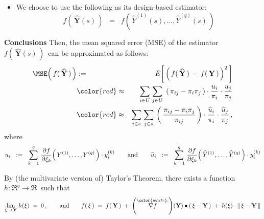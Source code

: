 \begin{proposition}
\begin{itemize}
    The target population parameter is:
    \begin{equation*}
    f\!\left(\,\mathbf{Y}\,\right)
    \;\; = \;\;
        f\!\left(\,Y^{(1)},\ldots,Y^{(q)}\,\right)
    \end{equation*}
\item
    We choose to use the following as its design-based estimator:
    \begin{equation*}
    f\!\left(\,\widehat{\mathbf{Y}}(s)\,\right)
    \;\; = \;\;
        f\!\left(\,\widehat{Y}^{(1)}(s),\ldots,\widehat{Y}^{(q)}(s)\,\right)
    \end{equation*}
\end{itemize}
\vskip 0.1cm
\noindent
\textbf{Conclusions}
\vskip 0.1cm
\noindent
Then, the mean squared error (MSE) of the estimator
\,$f\!\left(\,\widehat{\mathbf{Y}}(s)\,\right)$\,
can be approximated as follows:
\begin{eqnarray*}
\MSE\!\left(\,
    f(\,\widehat{\mathbf{Y}}\,)
    \,\right)
& := &
    E\!\left[\,\left(\,
        f(\,\widehat{\mathbf{Y}}\,)
        \, - \,
        f(\,\mathbf{Y}\,)
        \,\right)^{2}\,\right]
\\
& {\color{red}\approx} &
    \underset{i \in U}{\sum}\;
    \underset{j \in U}{\sum}\;
    \left(\,\pi_{ij} - \pi_{i}\pi_{j}\,\right)
    \cdot
    \dfrac{u_{i}}{\pi_{i}}
    \cdot
    \dfrac{u_{j}}{\pi_{j}}
\\
& {\color{red}\approx} &
    \underset{i \in s}{\sum}\;
    \underset{j \in s}{\sum}\,
    \left(\,
        \dfrac{
            \pi_{ij} - \pi_{i}\pi_{j}
            }{
            \pi_{ij}
            }
        \,\right)
    \cdot
    \dfrac{\widehat{u}_{i}}{\pi_{i}}
    \cdot
    \dfrac{\widehat{u}_{j}}{\pi_{j}}\,,
\end{eqnarray*}
where
\begin{equation*}
u_{i}
\;\; := \;\;
    \overset{q}{\underset{k\,=\,1}{\sum}}\;
    \dfrac{\partial f}{\partial \xi_{k}}\!\left(\,
        Y^{(1)},\ldots,Y^{(q)}
        \,\right)
    \cdot
    y^{(k)}_{i}
\quad\quad
\textnormal{and}
\quad\quad
\widehat{u}_{i}
\;\; := \;\;
    \overset{q}{\underset{k\,=\,1}{\sum}}\;
    \dfrac{\partial f}{\partial \xi_{k}}\!\left(\,
        \widehat{Y}^{(1)},\ldots,\widehat{Y}^{(q)}
        \,\right)
    \cdot
    y^{(k)}_{i}
\end{equation*}
\end{proposition}
\proof
By (the multivariate version of) Taylor's Theorem, there exists a function
\,$h : \Re^{q} \longrightarrow \Re$\, such that
\begin{equation*}
\underset{\xi\,\rightarrow\mathbf{Y}}{\lim}\;h(\xi)
\; = \;
    0\,,
\quad\quad
\textnormal{and}
\quad\quad
f\!\left(\,\xi\,\right)
\; = \;
    f\!\left(\,\mathbf{Y}\,\right)
    \; + \;
    \left(\overset{{\color{white}.}}{\nabla f}\right)\!(\mathbf{Y})
    \bullet
    \left(\,\xi - \mathbf{Y}\,\right)
    \; + \;
    h(\xi)\cdot\left\Vert\,\xi - \mathbf{Y}\,\right\Vert
\end{equation*}
